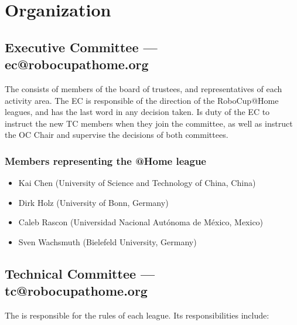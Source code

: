 \section{Organization}

%
%
\subsection{Executive Committee --- ec@robocupathome.org}
\label{sec:ec}
The  consists of members of the board of trustees, and representatives of each activity area. The EC is responsible of the direction of the RoboCup@Home leagues, and has the last word in any decision taken. Is duty of the EC to instruct the new TC members when they join the committee, as well as instruct the OC Chair and supervise the decisions of both committees.

\subsubsection{Members representing the @Home league}
\begin{itemize}
  \item Kai Chen (University of Science and Technology of China, China)
  \item Dirk Holz (University of Bonn, Germany)
  \item Caleb Rascon (Universidad Nacional Autónoma de México, Mexico)
  \item Sven Wachsmuth (Bielefeld University, Germany)
\end{itemize}


%
%
\subsection{Technical Committee --- tc@robocupathome.org}
\label{sec:tc}
The  is responsible for the rules of each league. Its responsibilities include:

